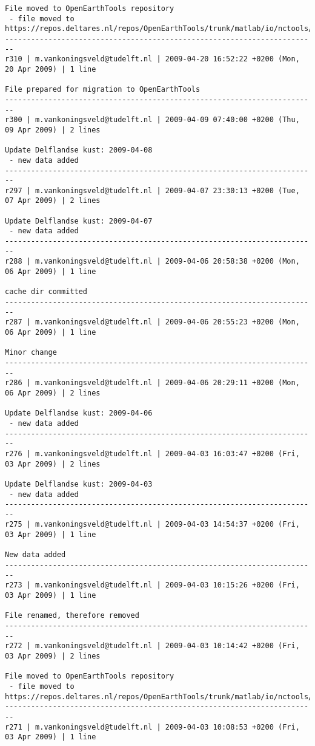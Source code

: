 \documentclass[9]{report}
\begin{document}
\begin{description}
\begin{verbatim}
File moved to OpenEarthTools repository
 - file moved to https://repos.deltares.nl/repos/OpenEarthTools/trunk/matlab/io/nctools/getDataFromBetCDFGrid.m
------------------------------------------------------------------------
r310 | m.vankoningsveld@tudelft.nl | 2009-04-20 16:52:22 +0200 (Mon, 20 Apr 2009) | 1 line

File prepared for migration to OpenEarthTools
------------------------------------------------------------------------
r300 | m.vankoningsveld@tudelft.nl | 2009-04-09 07:40:00 +0200 (Thu, 09 Apr 2009) | 2 lines

Update Delflandse kust: 2009-04-08
 - new data added
------------------------------------------------------------------------
r297 | m.vankoningsveld@tudelft.nl | 2009-04-07 23:30:13 +0200 (Tue, 07 Apr 2009) | 2 lines

Update Delflandse kust: 2009-04-07
 - new data added
------------------------------------------------------------------------
r288 | m.vankoningsveld@tudelft.nl | 2009-04-06 20:58:38 +0200 (Mon, 06 Apr 2009) | 1 line

cache dir committed
------------------------------------------------------------------------
r287 | m.vankoningsveld@tudelft.nl | 2009-04-06 20:55:23 +0200 (Mon, 06 Apr 2009) | 1 line

Minor change
------------------------------------------------------------------------
r286 | m.vankoningsveld@tudelft.nl | 2009-04-06 20:29:11 +0200 (Mon, 06 Apr 2009) | 2 lines

Update Delflandse kust: 2009-04-06
 - new data added
------------------------------------------------------------------------
r276 | m.vankoningsveld@tudelft.nl | 2009-04-03 16:03:47 +0200 (Fri, 03 Apr 2009) | 2 lines

Update Delflandse kust: 2009-04-03
 - new data added
------------------------------------------------------------------------
r275 | m.vankoningsveld@tudelft.nl | 2009-04-03 14:54:37 +0200 (Fri, 03 Apr 2009) | 1 line

New data added
------------------------------------------------------------------------
r273 | m.vankoningsveld@tudelft.nl | 2009-04-03 10:15:26 +0200 (Fri, 03 Apr 2009) | 1 line

File renamed, therefore removed
------------------------------------------------------------------------
r272 | m.vankoningsveld@tudelft.nl | 2009-04-03 10:14:42 +0200 (Fri, 03 Apr 2009) | 2 lines

File moved to OpenEarthTools repository
 - file moved to https://repos.deltares.nl/repos/OpenEarthTools/trunk/matlab/io/nctools/lookupVarnameInNetCDF.m  
------------------------------------------------------------------------
r271 | m.vankoningsveld@tudelft.nl | 2009-04-03 10:08:53 +0200 (Fri, 03 Apr 2009) | 1 line


\end{verbatim}
\end{description}
\end{document}
